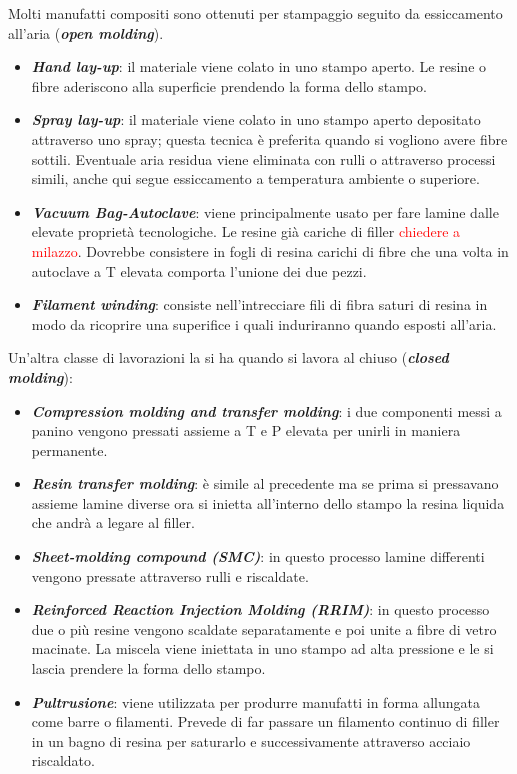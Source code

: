 \documentclass{article}
\begin{document}
Molti manufatti compositi sono ottenuti per stampaggio seguito da essiccamento all'aria (\textbf{\textit{open molding}}).
\begin{itemize}
    \item \textbf{\textit{Hand lay-up}}: il materiale viene colato in uno stampo aperto. Le resine o fibre aderiscono alla superficie prendendo la forma dello stampo.
    \item \textbf{\textit{Spray lay-up}}: il materiale viene colato in uno stampo aperto depositato attraverso uno spray; questa tecnica è preferita quando si vogliono avere fibre sottili. Eventuale aria residua viene eliminata con rulli o attraverso processi simili, anche qui segue essiccamento a temperatura ambiente o superiore.
    \item \textbf{\textit{Vacuum Bag-Autoclave}}: viene principalmente usato per fare lamine dalle elevate proprietà tecnologiche. Le resine già cariche di filler \textcolor{red}{chiedere a milazzo}. Dovrebbe consistere in fogli di resina carichi di fibre che una volta in autoclave a T elevata comporta l'unione dei due pezzi.
    \item  \textbf{\textit{Filament winding}}: consiste nell'intrecciare fili di fibra saturi di resina in modo da ricoprire una superifice i quali induriranno quando esposti all'aria.
\end{itemize}
Un'altra classe di lavorazioni la si ha quando si lavora al chiuso (\textbf{\textit{closed molding}}):
\begin{itemize}
    \item \textbf{\textit{Compression molding and transfer molding}}: i due componenti messi a panino vengono pressati assieme a T e P elevata per unirli in maniera permanente.
    \item \textbf{\textit{Resin transfer molding}}: è simile al precedente ma se prima si pressavano assieme lamine diverse ora si inietta all'interno dello stampo la resina liquida che andrà a legare al filler.
    \item \textbf{\textit{Sheet-molding compound (SMC)}}: in questo processo lamine differenti vengono pressate attraverso rulli e riscaldate.
    \item \textbf{\textit{Reinforced Reaction Injection Molding (RRIM)}}: in questo processo due o più resine vengono scaldate separatamente e poi unite a fibre di vetro macinate. La miscela viene iniettata in uno stampo ad alta pressione e le si lascia prendere la forma dello stampo.
    \item \textbf{\textit{Pultrusione}}: viene utilizzata per produrre manufatti in forma allungata come barre o filamenti. Prevede di far passare un filamento continuo di filler in un bagno di resina per saturarlo e successivamente attraverso acciaio riscaldato.
\end{itemize}
\end{document}
